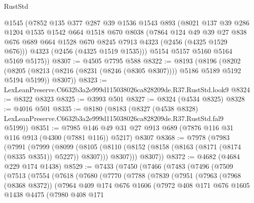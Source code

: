 \begin{lexlean}{RustStd}
\begin{coremodule}
      @1545
      (@7852
        @135
        @377
        @287
        @39
        @1536
        @1543
        @893
        (@8021
          @137
          @39
          @286
          @1204
          @1535
          @1542
          @664
          @1518
          @670
          @8038
          (@7864
            @124
            @49
            @39
            @27
            @838
            @676
            @689
            @664
            @1528
            @670
            @8245
            @7913
            @4323
            (@2456 (@4325 @1529 @676)))
          @4323
          (@2456 (@4325 @1519 @1535)))
        @5154
        @5157
        @5160
        @5164
        @5169
        @5175))
@8307 := @4505 @7795 @588
@8322 := @8193
    (@8196
      (@8202
        (@8205 (@8213 (@8216 (@8231 (@8246 (@8305 @8307)))) @5186 @5189 @5192 @5194 @5199))
        @8307))
@8323 := LexLeanPreserve.C6632b3a2e999d115038026ca828209de.R37.RustStd.look9
@8324 := @8322 @8323
@8325 := @3993 @501
@8327 := @8324 (@4534 @8325)
@8328 := @4016 @501
@8335 := @8180
    (@8183
      (@8327
        (@4538 @8328)
        LexLeanPreserve.C6632b3a2e999d115038026ca828209de.R37.RustStd.fal9
        @5199))
@8351 := @7985
    @146
    @49
    @31
    @27
    @913
    @689
    (@7876 @116 @31 @116 @913 (@4300 (@7881 @116)) @5217)
    @8307
@8368 := @7978
    (@7983
      (@7991
        (@7999
          (@8099
            (@8105
              (@8110 (@8152 (@8158 (@8163 (@8171 (@8174 (@8335 @8351)) @5227)) @8307)))
              @8307)))
        @8307))
@8372 := @4682 (@4684 @229 @174 @1438)
@8529 := @7433
    (@7450
      (@7466
        (@7483
          (@7496
            (@7509
              (@7513
                (@7554
                  (@7618
                    (@7680
                      (@7770
                        (@7788
                          (@7839
                            (@7951
                              (@7963
                                (@7968 (@8368 @8372))
                                (@7964
                                  @409
                                  @174
                                  @676
                                  @1606
                                  (@7972
                                    @408
                                    @171
                                    @676
                                    @1605
                                    @1438
                                    @4475
                                    (@7980
                                      @408
                                      @171

\end{coremodule}
\end{lexlean}
